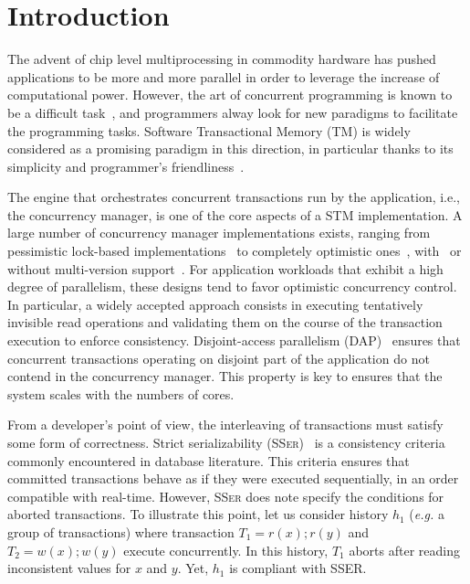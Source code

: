 \section{Introduction}

The advent of chip level multiprocessing in commodity hardware has pushed applications to be more and more parallel in order to leverage the increase of computational power.
However, the art of concurrent programming is known to be a difficult task~\cite{Lee:2006:PT:1137232.1137289}, and programmers alway look for new paradigms to facilitate the programming tasks.
Software Transactional Memory (TM) is widely considered as a promising paradigm in this direction, in particular thanks to its simplicity and programmer's friendliness~\cite{Dragojevic:2011:WSM:1924421.1924440}.

The engine that orchestrates concurrent transactions run by the application, i.e., the concurrency manager, is one of the core aspects of a STM implementation.
A large number of concurrency manager implementations exists, ranging from pessimistic lock-based implementations~\cite{harris2005revocable,afek2012pessimistic} to completely optimistic ones~\cite{hassan2014optimistic}, with~\cite{perelman2011smv} or without multi-version support~\cite{attiya2012single}.
For application workloads that exhibit a high degree of parallelism, these designs tend to favor optimistic concurrency control.
In particular, a widely accepted approach consists in executing tentatively invisible read operations and validating them on the course of the transaction execution to enforce consistency.
Disjoint-access parallelism (DAP)~\cite{ellen2012universal} ensures that concurrent transactions operating on disjoint part of the application do not contend in the concurrency manager.
This property is key to ensures that the system scales with the numbers of cores.

From a developer's point of view, the interleaving of transactions must satisfy some form of correctness.
Strict serializability (\textsc{SSer})~\cite{herlihy1990linearizability} is a consistency criteria commonly encountered in database literature.
This criteria ensures that committed transactions behave as if they were executed sequentially, in an order compatible with real-time.
However, \textsc{SSer} does note specify the conditions for aborted transactions.
To illustrate this point, let us consider history $h_1$ (\emph{e.g.} a group of transactions) where transaction $T_1=r(x);r(y)$ and $T_2=w(x);w(y)$ execute concurrently.
In this history, $T_1$ aborts after reading inconsistent values for $x$ and $y$.
Yet, $h_1$ is compliant with SSER.


